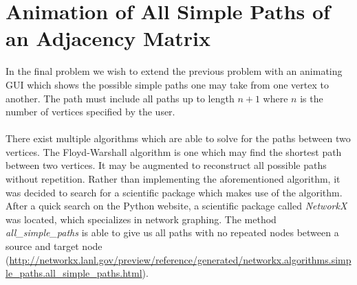 \section{Animation of All Simple Paths of an Adjacency Matrix} %
\label{sec:animation_of_all_simple_paths_of_an_adjacency_matrix}
In the final problem we wish to extend the previous problem with an animating GUI which shows the possible simple paths one may take from one vertex to another. The path must include all paths up to length $n+1$ where $n$ is the number of vertices specified by the user.\\\\
There exist multiple algorithms which are able to solve for the paths between two vertices. The Floyd-Warshall algorithm is one which may find the shortest path between two vertices. It may be augmented to reconstruct all possible paths without repetition. Rather than implementing the aforementioned algorithm, it was decided to search for a scientific package which makes use of the algorithm. After a quick search on the Python website, a scientific package called \emph{NetworkX} was located, which specializes in network graphing. The method \emph{all\_simple\_paths} is able to give us all paths with no repeated nodes between a source and target node (\url{http://networkx.lanl.gov/preview/reference/generated/networkx.algorithms.simple_paths.all_simple_paths.html}).

